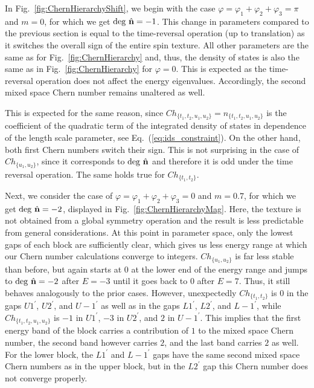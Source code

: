\documentclass[submission, Phys]{SciPost}
\begin{document}
\figureVIa

In Fig.~\ref{fig:ChernHierarchyShift}, we begin with the case $\varphi=\varphi_1+\varphi_2+\varphi_3=\pi$ and $m=0$, for which we get $\mathrm{deg}~\hat{\mathbf{n}}=-1$.  
This change in parameters compared to the previous section is equal to the time-reversal operation (up to translation) as it switches the overall sign of the entire spin texture. 
All other parameters are the same as for Fig.~\ref{fig:ChernHierarchy} and, thus, the density of states is also the same as in Fig.~\ref{fig:ChernHierarchy} for $\varphi=0$. This is expected as the time-reversal operation does not affect the energy eigenvalues. 
Accordingly, the second mixed space Chern number remains unaltered as well.

\figureVIIa
\figureVIIIa

This is expected for the same reason, since $Ch_{\lbrace t_1, t_2, u_1, u_2 \rbrace }=n_{\lbrace t_1, t_2, u_1, u_2 \rbrace }$ is the coefficient of the quadratic term of the integrated density of states in dependence of the length scale parameter, see Eq.~(\ref{eq:ids_constraint}).
On the other hand, both first Chern numbers switch their sign. 
This is not surprising in the case of $Ch_{\lbrace u_1, u_2 \rbrace }$, since it corresponds to $\mathrm{deg}~\hat{\mathbf{n}}$ and therefore it is odd under the time reversal operation. 
The same holds true for  $Ch_{\lbrace t_1, t_2 \rbrace }$.

Next, we consider the case of $\varphi=\varphi_1+\varphi_2+\varphi_3=0$ and $m=0.7$, for which we get $\mathrm{deg}~\hat{\mathbf{n}}=-2$, displayed in Fig.~\ref{fig:ChernHierarchyMag}. Here, the texture is not obtained from a global symmetry operation and the result is less predictable from general considerations.
At this point in parameter space, only the lowest gaps of each block are sufficiently clear, which gives us less energy range at which our Chern number calculations converge to integers. 
$Ch_{\lbrace u_1, u_2 \rbrace }$ is far less stable than before, but again starts at $0$ at the lower end of the energy range and jumps to $\mathrm{deg}~\hat{\mathbf{n}}=-2$ after $E=-3$ until it goes back to $0$ after $E=7$. 
Thus, it still behaves analogously to the prior cases.
However, unexpectedly $Ch_{\lbrace t_1, t_2 \rbrace }$ is $0$ in the gaps $U1^{\prime}$, $U2^{\prime}$, and $U-1^{\prime}$ as well as in the gaps $L1^{\prime}$, $L2^{\prime}$, and $L-1^{\prime}$, while
$Ch_{\lbrace t_1, t_2, u_1, u_2 \rbrace }$ is $-1$ in $U1^{\prime}$, $-3$ in $U2^{\prime}$, and $2$ in $U-1^{\prime}$.
This implies that the first energy band of the block carries a contribution of $1$ to the mixed space Chern number, the second band however carries $2$, and the last band carries $2$ as well.
For the lower block, the $L1^{\prime}$ and $L-1^{\prime}$ gaps have the same second mixed space Chern numbers as in the upper block, but in the $L2^{\prime}$ gap this Chern number does not converge properly.
\end{document}
